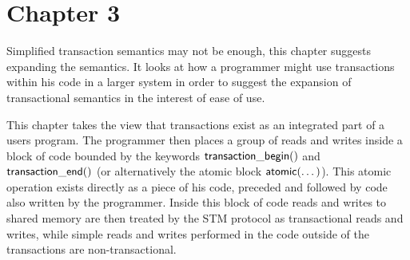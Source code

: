 \documentclass[runningheads,a4paper]{article}
\begin{document}
% 














\section{Chapter 3}
Simplified transaction semantics may not be enough,
this chapter suggests expanding the semantics.
It looks at how a programmer might use transactions
within his code in a larger system in order to suggest the expansion of transactional
semantics in the interest of ease of use.



This chapter takes the view that transactions exist as an integrated part of
a users program.
The programmer then places a group of reads and writes
inside a block of code bounded by the keywords ${\sf transaction\_begin}()$ and
${\sf transaction\_end}()$ (or alternatively the atomic block ${\sf atomic}(\dots)$).
This atomic operation exists directly as a piece of his code, preceded
and followed by code also written by the programmer.
Inside this block of code reads and writes to shared memory are then
treated by the STM protocol as transactional reads and writes,
while simple reads and writes performed in the code outside of the transactions
are non-transactional.
\end{document}

